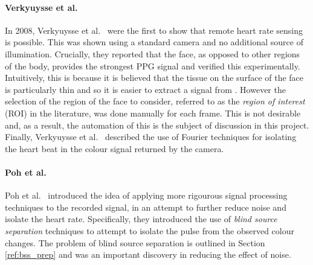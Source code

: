 \paragraph{Verkyuysse et al.}
In 2008, Verkyuysse et al.~\cite{Verkruysse2008} were the first to show that remote heart rate sensing is possible. This was shown using a standard camera and no additional source of 
illumination. Crucially, they reported that the face, as opposed to other regions of the body, provides the strongest PPG signal and verified this experimentally. 
Intuitively, this is because
it is believed that the tissue on the surface of the face is particularly thin and so it is easier to extract a signal from \cite{vanderKooij2019}. 
However the selection of the region of the face to consider, referred to as the \textit{region of interest} (ROI) in the literature, was done manually for each frame. This is not desirable and, 
as a result, the automation of this is the subject of discussion in this project. Finally, Verkyuysse et al.~\cite{Verkruysse2008} described the use of Fourier techniques for isolating the 
heart beat in the colour signal returned by the camera.

\paragraph{Poh et al.}
Poh et al.~\cite{poh2010non} introduced the idea of applying more rigourous signal processing techniques to the recorded signal, in an attempt to further reduce noise and isolate the heart rate.
Specifically, they introduced the use of \textit{blind source separation} techniques to attempt to isolate the pulse from the observed colour changes. The problem of blind source separation is 
outlined in Section \ref{ref:bss_prep} and was an important discovery in reducing the effect of noise.


